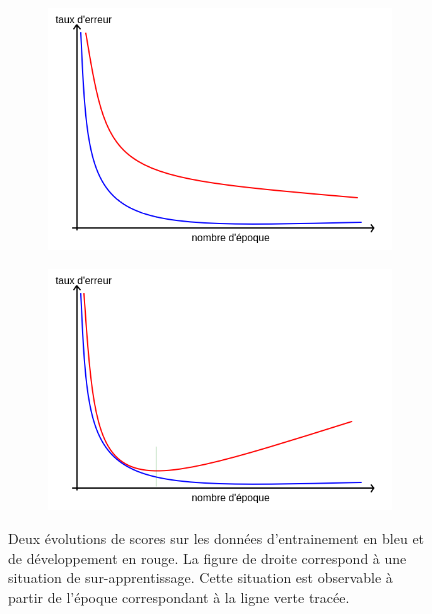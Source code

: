 \begin{figure}[ht]
  \centering
  \begin{subfigure}{.49\textwidth}
    \centering
    \includegraphics[width=.9\linewidth]{./Chapitre2/figures/surapprentissage2.png}
  \end{subfigure}
  \begin{subfigure}{.49\textwidth}
    \centering
    \includegraphics[width=.9\linewidth]{./Chapitre2/figures/surapprentissage1.png}
  \end{subfigure}
  \caption{Deux évolutions de scores sur les données d'entrainement en bleu et de développement en rouge. La figure de droite correspond à une situation de sur-apprentissage. Cette situation est observable à partir de l'époque correspondant à la ligne verte tracée.}
  \label{fig:surapprentissage}
\end{figure}

